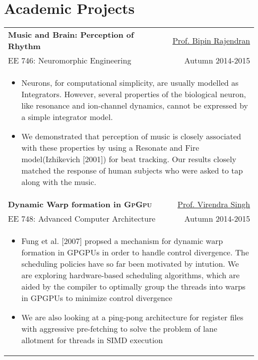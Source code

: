 \documentclass[a4paper,8pt]{article} %
\begin{document}
{\begin{longtable}{lr}
\end{longtable}


\section{Academic Projects}

\begin{tabular}{lr}

\textbf{Music and Brain: Perception of Rhythm} & \href{https://www.ee.iitb.ac.in/web/faculty/homepage/bipin}{Prof. Bipin Rajendran} \\
EE 746: Neuromorphic Engineering & Autumn 2014-2015 \\
\multicolumn{2}{p{16.5cm}}{
\begin{itemize}
	\item Neurons, for computational simplicity, are usually modelled as Integrators. However, several properties of the biological neuron, like resonance and ion-channel dynamics, cannot be expressed by a simple integrator model.  
	\item We demonstrated that perception of music is closely associated with these properties by using a Resonate and Fire model(Izhikevich [2001]) for beat tracking. Our results closely matched the response of human subjects who were asked to tap along with the music.
\end{itemize}
}\\

\textbf{Dynamic Warp formation in \textsc{GpGpu}} & \href{https://www.ee.iitb.ac.in/~viren/}{Prof. Virendra Singh}\\
EE 748: Advanced Computer Architecture & Autumn 2014-2015 \\
\multicolumn{2}{p{16.5cm}}{
\begin{itemize}
	\item Fung et al. [2007] propsed a mechanism for dynamic warp formation in GPGPUs in order to handle control divergence. The scheduling policies have so far been motivated by intution. We are exploring hardware-based scheduling algorithms, which are aided by the compiler to optimally group the threads into warps in GPGPUs to minimize control divergence   
	\item We are also looking at a ping-pong architecture for register files with aggressive pre-fetching to solve the problem of lane allotment for threads in SIMD execution
\end{itemize}
}\\


\end{tabular}}
\end{document}
